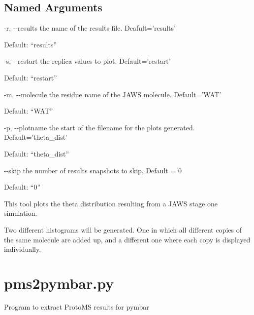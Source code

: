 \documentclass[letterpaper,10pt,english]{sphinxmanual}
\begin{document}
\subsection{Named Arguments}
\label{\detokenize{tools:Named Arguments}}\begin{optionlist}{3cm}
\item [-r, -{-}results]  
the name of the results file. Deafult=’results’

Default: “results”
\item [-s, -{-}restart]  
the replica values to plot. Default=’restart’

Default: “restart”
\item [-m, -{-}molecule]  
the residue name of the JAWS molecule. Default=’WAT’

Default: “WAT”
\item [-p, -{-}plotname]  
the start of the filename for the plots generated. Default=’theta\_dist’

Default: “theta\_dist”
\item [-{-}skip]  
the number of results snapshots to skip, Default = 0

Default: “0”
\end{optionlist}


%
\begin{sphinxVerbatim}[commandchars=\\\{\}]
    
    
\end{sphinxVerbatim}


This tool plots the theta distribution resulting from a JAWS stage one simulation.

Two different histograms will be generated. One in which all different copies of the same molecule are added up, and a different one where each copy is displayed individually.


\section{pms2pymbar.py}
\label{\detokenize{tools:pms2pymbar-py}}

Program to extract ProtoMS results for pymbar
\end{document}
